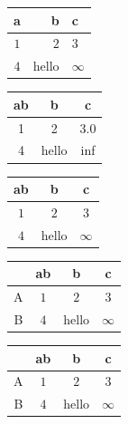 \documentclass{article}
\begin{document}
  \begin{table}[ht]
  \begin{center}
    \begin{tabular}{c|r|l}
    \toprule
      a & b & c\\
      \midrule
      $1$ & $2$ & $3$\\
      $4$ & hello & $\infty$\\
    \bottomrule
    \end{tabular}
  \end{center}
\end{table}

\begin{table}[ht]
\begin{center}
  \begin{tabular}{ccc}
  \toprule
  ab & b & c\\
   \midrule
  1 & 2 & 3.0\\
  4 & hello & inf\\
  \bottomrule
  \end{tabular}
\end{center}
\end{table}


\begin{table}[ht]
  \begin{center}
    \begin{tabular}{|ccc|}
    \toprule
      ab & b & c\\
      \midrule
      $1$ & $2$ & $3$\\
      $4$ & hello & $\infty$\\
    \bottomrule
    \end{tabular}
  \end{center}
\end{table}

\begin{table}[ht]
  \begin{center}
    \begin{tabular}{rccc}
    \toprule
       & ab & b & c\\
      \midrule
      A & $1$ & $2$ & $3$\\
      B & $4$ & hello & $\infty$\\
    \bottomrule
    \end{tabular}
  \end{center}
\end{table}

\begin{table}[ht]
  \begin{center}
    \begin{tabular}{rccc}
    \toprule
       & ab & b & c\\
      \midrule
      A & $1$ & $2$ & $3$\\
      B & $4$ & hello & $\infty$\\
    \bottomrule
    \end{tabular}
  \end{center}
\end{table}
\end{document}

